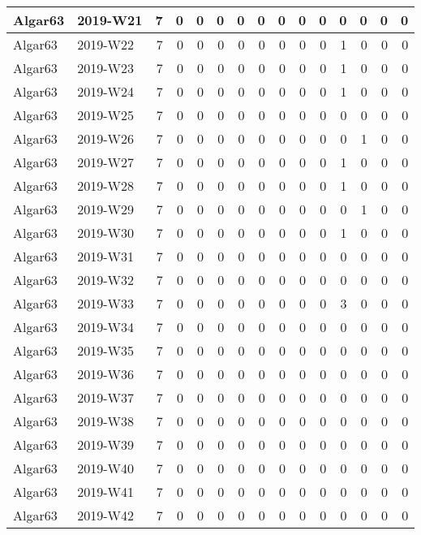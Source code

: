 \documentclass[]{book}
\begin{document}
\begin{table}
\begin{tabular}[t]{l|l|r|r|r|r|r|r|r|r|r|r|r|r|r}
\hline
Algar63 & 2019-W21 & 7 & 0 & 0 & 0 & 0 & 0 & 0 & 0 & 0 & 0 & 0 & 0 & 0\\
\hline
Algar63 & 2019-W22 & 7 & 0 & 0 & 0 & 0 & 0 & 0 & 0 & 0 & 1 & 0 & 0 & 0\\
\hline
Algar63 & 2019-W23 & 7 & 0 & 0 & 0 & 0 & 0 & 0 & 0 & 0 & 1 & 0 & 0 & 0\\
\hline
Algar63 & 2019-W24 & 7 & 0 & 0 & 0 & 0 & 0 & 0 & 0 & 0 & 1 & 0 & 0 & 0\\
\hline
Algar63 & 2019-W25 & 7 & 0 & 0 & 0 & 0 & 0 & 0 & 0 & 0 & 0 & 0 & 0 & 0\\
\hline
Algar63 & 2019-W26 & 7 & 0 & 0 & 0 & 0 & 0 & 0 & 0 & 0 & 0 & 1 & 0 & 0\\
\hline
Algar63 & 2019-W27 & 7 & 0 & 0 & 0 & 0 & 0 & 0 & 0 & 0 & 1 & 0 & 0 & 0\\
\hline
Algar63 & 2019-W28 & 7 & 0 & 0 & 0 & 0 & 0 & 0 & 0 & 0 & 1 & 0 & 0 & 0\\
\hline
Algar63 & 2019-W29 & 7 & 0 & 0 & 0 & 0 & 0 & 0 & 0 & 0 & 0 & 1 & 0 & 0\\
\hline
Algar63 & 2019-W30 & 7 & 0 & 0 & 0 & 0 & 0 & 0 & 0 & 0 & 1 & 0 & 0 & 0\\
\hline
Algar63 & 2019-W31 & 7 & 0 & 0 & 0 & 0 & 0 & 0 & 0 & 0 & 0 & 0 & 0 & 0\\
\hline
Algar63 & 2019-W32 & 7 & 0 & 0 & 0 & 0 & 0 & 0 & 0 & 0 & 0 & 0 & 0 & 0\\
\hline
Algar63 & 2019-W33 & 7 & 0 & 0 & 0 & 0 & 0 & 0 & 0 & 0 & 3 & 0 & 0 & 0\\
\hline
Algar63 & 2019-W34 & 7 & 0 & 0 & 0 & 0 & 0 & 0 & 0 & 0 & 0 & 0 & 0 & 0\\
\hline
Algar63 & 2019-W35 & 7 & 0 & 0 & 0 & 0 & 0 & 0 & 0 & 0 & 0 & 0 & 0 & 0\\
\hline
Algar63 & 2019-W36 & 7 & 0 & 0 & 0 & 0 & 0 & 0 & 0 & 0 & 0 & 0 & 0 & 0\\
\hline
Algar63 & 2019-W37 & 7 & 0 & 0 & 0 & 0 & 0 & 0 & 0 & 0 & 0 & 0 & 0 & 0\\
\hline
Algar63 & 2019-W38 & 7 & 0 & 0 & 0 & 0 & 0 & 0 & 0 & 0 & 0 & 0 & 0 & 0\\
\hline
Algar63 & 2019-W39 & 7 & 0 & 0 & 0 & 0 & 0 & 0 & 0 & 0 & 0 & 0 & 0 & 0\\
\hline
Algar63 & 2019-W40 & 7 & 0 & 0 & 0 & 0 & 0 & 0 & 0 & 0 & 0 & 0 & 0 & 0\\
\hline
Algar63 & 2019-W41 & 7 & 0 & 0 & 0 & 0 & 0 & 0 & 0 & 0 & 0 & 0 & 0 & 0\\
\hline
Algar63 & 2019-W42 & 7 & 0 & 0 & 0 & 0 & 0 & 0 & 0 & 0 & 0 & 0 & 0 & 0\\

\end{tabular}
\end{table}
\end{document}
